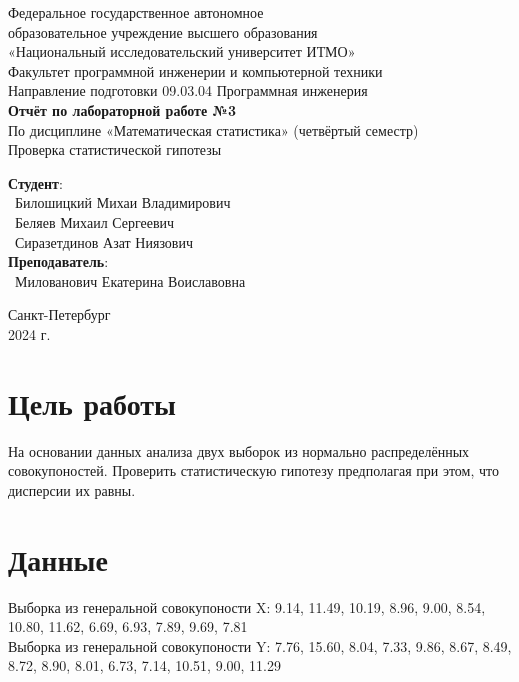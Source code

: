 \documentclass{article}
\begin{document}
\begin{center}
    \Large
    Федеральное государственное автономное \\
    образовательное учреждение высшего образования \\ 
    «Национальный исследовательский университет ИТМО»\\
    \vspace{0.5cm}
    \large
    Факультет программной инженерии и компьютерной техники \\
    Направление подготовки 09.03.04 Программная инженерия \\
    \vspace{1cm}
    \Large
    \textbf{Отчёт по лабораторной работе №3} \\
    По дисциплине «Математическая статистика» (четвёртый семестр)\\
    Проверка статистической гипотезы\\
    \large
    \vspace{8cm}

    \begin{minipage}{.33\textwidth}
    \end{minipage}
    \hfill
    \begin{minipage}{.4\textwidth}
    
        \textbf{Студент}: \vspace{.1cm} \\
        \ Билошицкий Михаи Владимирович\\
        \ Беляев Михаил Сергеевич\\
        \ Сиразетдинов Азат Ниязович\\
        \textbf{Преподаватель}:  \\
        \ Милованович Екатерина Воиславовна
    \end{minipage}
    \vfill
Санкт-Петербург\\ 2024 г.
\end{center}
\thispagestyle{empty}

\newpage
\section*{Цель работы}
На основании данных анализа двух выборок из нормально распределённых совокупоностей. Проверить статистическую гипотезу предполагая при этом, что дисперсии их равны.
\section*{Данные }
Выборка из генеральной совокупоности X: 9.14, 11.49, 10.19, 8.96, 9.00, 8.54, 10.80, 11.62, 6.69, 6.93, 7.89, 9.69, 7.81
\\
Выборка из генеральной совокупоности Y: 7.76, 15.60, 8.04, 7.33, 9.86, 8.67, 8.49, 8.72, 8.90, 8.01, 6.73, 7.14, 10.51, 9.00, 11.29
\end{document}
